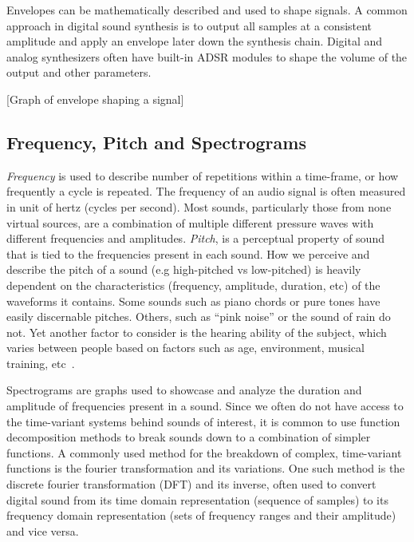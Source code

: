 \documentclass[runningheads,a4paper]{llncs}
\begin{document}
Envelopes can be mathematically described and used to shape signals. A common approach in digital sound synthesis is to output all samples at a consistent amplitude and apply an envelope later down the synthesis chain. Digital and analog synthesizers often have built-in ADSR modules to shape the volume of the output and other parameters.  

[Graph of envelope shaping a signal]
\subsection{Frequency, Pitch and Spectrograms}
\textit{Frequency} is used to describe number of repetitions within a time-frame, or how frequently a cycle is repeated. The frequency of an audio signal is often measured in unit of hertz (cycles per second). Most sounds, particularly those from none virtual sources, are a combination of multiple different pressure waves with different frequencies and amplitudes. \textit{Pitch}, is a perceptual property of sound that is tied to the frequencies present in each sound. How we perceive and describe the pitch of a sound (e.g high-pitched vs low-pitched) is heavily dependent on the characteristics (frequency, amplitude, duration, etc) of the waveforms it contains. Some sounds such as piano chords or pure tones have easily discernable pitches. Others, such as \enquote{pink noise} or the sound of rain do not. Yet another factor to consider is the hearing ability of the subject, which varies between people based on factors such as age, environment, musical training, etc~\cite{reiss2016meta,alain2007age,newman2012grm7}. 

Spectrograms are graphs used to showcase and analyze the duration and amplitude of frequencies present in a sound. Since we often do not have access to the time-variant systems behind sounds of interest, it is common to use function decomposition methods to break sounds down to a combination of simpler functions. A commonly used method for the breakdown of complex, time-variant functions is the fourier transformation and its variations. One such method is the discrete fourier transformation (DFT) and its inverse, often used to convert digital sound from its time domain representation (sequence of samples) to its frequency domain representation (sets of frequency ranges and their amplitude) and vice versa.\\\\
\end{document}
